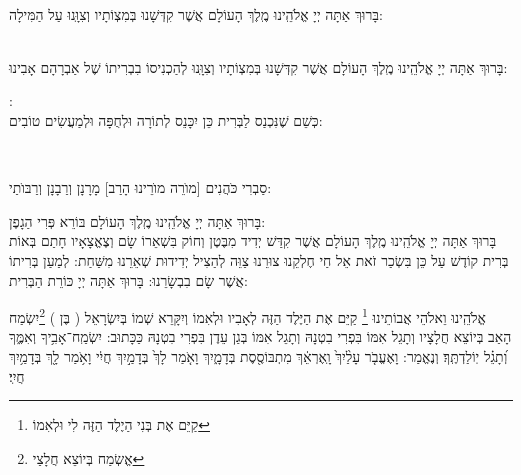 \documentclass[twoside, openany, parskip=half, 11pt]{book}
\begin{document}

\\
בָּרוּךְ אַתָּה יְיָ אֱלֹהֵֽינוּ מֶֽלֶךְ הָעוֹלָם  אֲשֶׁר קִדְּשָׁנוּ בְּמִצְוֹתָיו  וְצִוָּֽנוּ עַל הַמִּילָה:

\\
בָּרוּךְ אַתָּה יְיָ אֱלֹהֵֽינוּ מֶֽלֶךְ הָעוֹלָם  אֲשֶׁר קִדְּשָׁנוּ בְּמִצְוֹתָיו וְצִוָּֽנוּ לְהַכְנִיסוֹ בִבְרִיתוֹ שֶׁל אַבְרָהָם אָבִינוּ:

\kahal:\\
כְּשֵׁם שֶׁנִּכְנַס לַבְּרִית  כֵּן יִכָּנֵס לְתוֹרָה וּלְחֻפָּה וּלְמַעֲשִׂים טוֹבִים:

\\
\begin{footnotesize}
סַבְרִי כֹּהֲנִים [מוׂרֵה מוׂרֵינוּ הָרַב] מָרָנָן וְרַבָנָן וְרַבּוׂתַי:\\
\end{footnotesize}
בָּרוּךְ אַתָּה יְיָ אֱלֹהֵֽינוּ מֶֽלֶךְ הָעוֹלָם בּוֹרֵא פְּרִי הַגָפֶן:\\
בָּרוּךְ אַתָּה יְיָ אֱלֹהֵֽינוּ מֶֽלֶךְ הָעוֹלָם  אֲשֶׁר קִדַּשׁ יְדִיד מִבֶּטֶן  וְחוֹק בִּשְׁאֵרוֹ שָׂם  וְצֶאֱצָאָיו חָתַם בְּאוֹת בְּרִית קוֹדֶשׁ  עַל כֵּן בִּשְׂכַר זֹאת  אֵל חַי  חֶלְקֵנוּ צוּרֵנוּ  צַוֵּה לְהַצִיל יְדִידוּת שְׁאֵרֵנוּ מִשַּׁחַת: לְמַעַן בְּרִיתוֹ אֲשֶׁר שָׂם בִבְשָׂרֵנוּ: בָּרוּךְ אַתָּה יְיָ כּוֹרֵת הַבְּרִית:

אֱלֹהֵֽינוּ וֵאלֹהֵי אֲבוֹתֵינוּ \footnote{ 
קַיֵּם אֶת בְּנִי הַיֶלֶד הַזֶּה לִי וּלְאִמוֹ} קַיֵּם אֶת הַיֶּלֶד הַזֶּה לְאָבִיו וּלְאִמוֹ וְיִקָּרֵא שְׁמוֹ בְּיִשְׂרָאֵל ( בֶּן ) \footnote{ 
אֱשְׂמַח בְּיוֹצֵא חֲלָצַי}יִשְׂמַח הָאַב בְּיוֹצֵא חֲלָצָיו וְתָגֵל אִמּוֹ בִּפְרִי בִטְנָהּ וְתָגֵל אִמּוֹ בְּגַן עֵדֶן בִּפְרִי בִטְנָהּ  
כַּכָּתוּב: יִשְׂמַֽח־אָבִ֥יךָ
 וְאִמֶּ֑ךָ וְ֝תָגֵ֗ל יֽוֹלַדְתֶּֽךָ׃ 
וְנֶאֱמַר: וָאֶעֱבֹ֤ר
 עָלַ֨יִךְ֙ וָֽאֶרְאֵ֔ךְ מִתְבּוֹסֶ֖סֶת בְּדָמָ֑יִךְ 
וָאֹ֤מַר לָךְ֙ בְּדָמַ֣יִךְ חֲיִ֔י וָאֹ֥מַר לָ֖ךְ בְּדָמַ֥יִךְ חֲיִֽי׃
\end{document}
